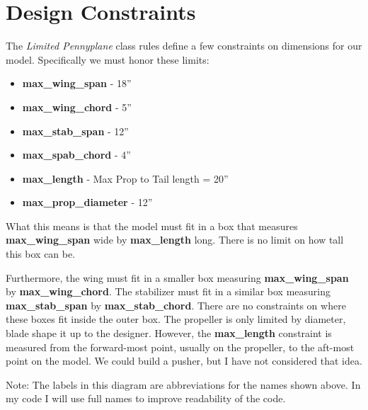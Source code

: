 \section{Design Constraints}

The {\it Limited Pennyplane} class rules define a few constraints on dimensions
for our model. Specifically we must honor these limits:

\begin{itemize}
\item{{\bf max\_wing\_span} -  18''}
\item{{\bf max\_wing\_chord} -  5''}
\item{{\bf max\_stab\_span} - 12''}
\item{{\bf max\_spab\_chord} - 4''}
\item{{\bf max\_length} - Max Prop to Tail length = 20''}
\item{{\bf max\_prop\_diameter} - 12''}
\end{itemize}

What this means is that the model must fit in a box that measures {\bf
max\_wing\_span} wide by {\bf max\_length} long. There is no limit on how
tall this box can be.

Furthermore, the wing must fit in a smaller box measuring {\bf max\_wing\_span}
by {\bf max\_wing\_chord}. The stabilizer must fit in a similar box measuring
{\bf max\_stab\_span} by {\bf max\_stab\_chord}. There are no constraints on where
these boxes fit inside the outer box. The propeller is only limited by
diameter, blade shape it up to the designer. However, the {\bf max\_length}
constraint is measured from the forward-most point, usually on the propeller,
to the aft-most point on the model. We could build a pusher, but I have not
considered that idea.


Note: The labels in this diagram are abbreviations for the names shown above.
In my code I will use full names to improve readability of the code.
